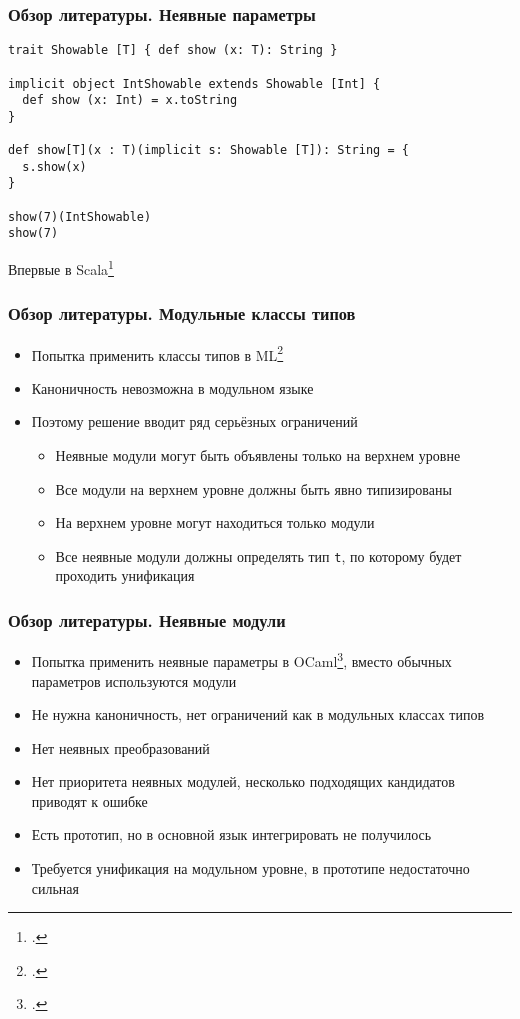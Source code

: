 \documentclass{beamer}
\begin{document}
\lstset{language=scala}
\begin{frame}[fragile]\frametitle{Обзор литературы. Неявные параметры}
\begin{lstlisting}
trait Showable [T] { def show (x: T): String }

implicit object IntShowable extends Showable [Int] {
  def show (x: Int) = x.toString
}

def show[T](x : T)(implicit s: Showable [T]): String = {
  s.show(x)
}

show(7)(IntShowable)
show(7)
\end{lstlisting}
Впервые в Scala\footcite{implicits}
\end{frame}

\begin{frame}\frametitle{Обзор литературы. Модульные классы типов}
\begin{itemize}
  \item Попытка применить классы типов в ML\footcite{ml_typeclasses}
  \item Каноничность невозможна в модульном языке
  \item Поэтому решение вводит ряд серьёзных ограничений
  \begin{itemize}
    \item Неявные модули могут быть объявлены только на верхнем уровне
    \item Все модули на верхнем уровне должны быть явно типизированы
    \item На верхнем уровне могут находиться только модули
    \item Все неявные модули должны определять тип \texttt{t}, по которому будет проходить унификация 
  \end{itemize}
\end{itemize}
\end{frame}

\begin{frame}\frametitle{Обзор литературы. Неявные модули}
\begin{itemize}
  \item Попытка применить неявные параметры в OCaml\footcite{white}, вместо обычных параметров используются модули
  \item Не нужна каноничность, нет ограничений как в модульных классах типов
  \item Нет неявных преобразований
  \item Нет приоритета неявных модулей, несколько подходящих кандидатов приводят к ошибке
  \item Есть прототип, но в основной язык интегрировать не получилось
  \item Требуется унификация на модульном уровне, в прототипе недостаточно сильная
\end{itemize}
\end{frame}
\end{document}
